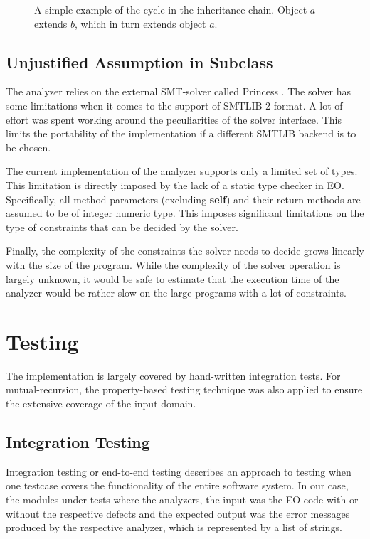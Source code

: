 \begin{figure}
  \begin{center}
    \begin{tabular}{c}  
  
    \end{tabular}
  \end{center}
  \caption{A simple example of the cycle in the inheritance chain. Object $a$ extends $b$, which in turn extends object $a$.}
  \label{fig:inheritance_chain}
\end{figure}

\subsection{Unjustified Assumption in Subclass}
The analyzer relies on the external SMT-solver called Princess \cite{princess}. The solver has some limitations when it comes to the support of SMTLIB-2 \cite{smtlib} format. A lot of effort was spent working around the peculiarities of the solver interface. This limits the portability of the implementation if a different SMTLIB backend is to be chosen.

The current implementation of the analyzer supports only a limited set of types. This limitation is directly imposed by the lack of a static type checker in EO. Specifically, all method parameters (excluding \textbf{self}) and their return methods are assumed to be of integer numeric type. This imposes significant limitations on the type of constraints that can be decided by the solver.

Finally, the complexity of the constraints the solver needs to decide grows linearly with the size of the program. While the complexity of the solver operation is largely unknown, it would be safe to estimate that the execution time of the analyzer would be rather slow on the large programs with a lot of constraints.

\section{Testing}
\label{eval:testing}
The implementation is largely covered by hand-written integration tests. For mutual-recursion, the property-based testing technique \cite{property_based_testing} was also applied to ensure the extensive coverage of the input domain.

\subsection{Integration Testing}
\label{eval:integration_testing}
Integration testing or end-to-end testing \cite[Chapter 7]{testing} describes an approach to testing when one testcase covers the functionality of the entire software system. In our case, the modules under tests where the analyzers, the input was the EO code with or without the respective defects and the expected output was the error messages produced by the respective analyzer, which is represented by a list of strings.

